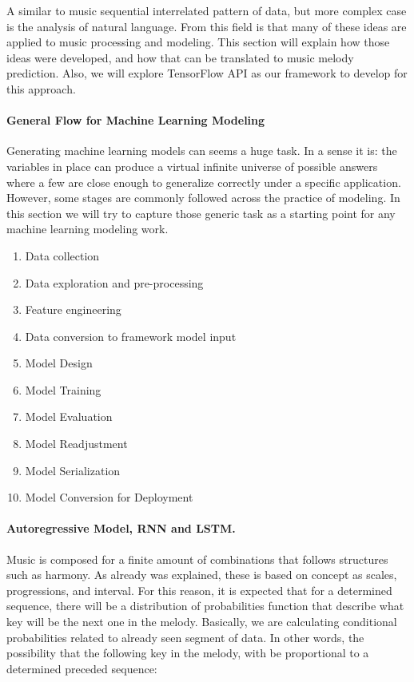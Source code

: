 A similar to music sequential interrelated pattern of data, but more complex case is the
analysis of natural language. From this field is that many of these ideas are applied to
music processing and modeling. This section will explain how those ideas were
developed, and how that can be translated to music melody prediction. Also, we will
explore TensorFlow API as our framework to develop for this approach.

\paragraph{General Flow for Machine Learning Modeling}

Generating machine learning models can seems a huge task. In a sense it is: the variables
in place can produce a virtual infinite universe of possible answers where a few are close
enough to generalize correctly under a specific application. However, some stages are
commonly followed across the practice of modeling. In this section we will try to capture
those generic task as a starting point for any machine learning modeling work.

\begin{enumerate}
  \item Data collection
  \item Data exploration and pre-processing
  \item Feature engineering
  \item Data conversion to framework model input
  \item Model Design
  \item Model Training
  \item Model Evaluation
  \item Model Readjustment
  \item Model Serialization
  \item Model Conversion for Deployment
\end{enumerate}

\paragraph{Autoregressive Model, RNN and LSTM.} Music is composed for a finite amount of
combinations that follows structures such as harmony. As already was explained, these is
based on concept as scales, progressions, and interval. For this reason, it is expected
that for a determined sequence, there will be a distribution of probabilities function
that describe what key will be the next one in the melody. Basically, we are calculating
conditional probabilities related to already seen segment of data. In other words, the
possibility that the following key in the melody, with be proportional to a determined
preceded sequence:

